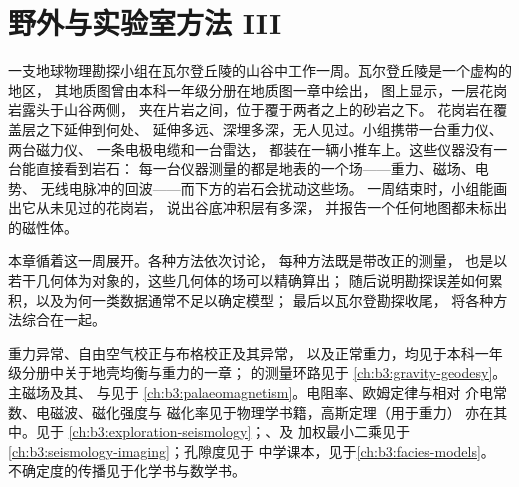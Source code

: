 \chapter{野外与实验室方法 III}\label{ch:b3:field-lab-methods-3}

一支地球物理勘探小组在瓦尔登丘陵的山谷中工作一周。瓦尔登丘陵是一个虚构的地区，
其地质图曾由本科一年级分册在地质图一章中绘出，
图上显示，一层花岗岩露头于山谷两侧，
夹在片岩之间，位于覆于两者之上的砂岩之下。
花岗岩在覆盖层之下延伸到何处、
延伸多远、深埋多深，无人见过。小组携带一台重力仪、两台磁力仪、
一条电极电缆和一台雷达，
都装在一辆小推车上。这些仪器没有一台能直接看到岩石：
每一台仪器测量的都是地表的一个场——重力、磁场、电势、
无线电脉冲的回波——而下方的岩石会扰动这些场。
一周结束时，小组能画出它从未见过的花岗岩，
说出谷底冲积层有多深，
并报告一个任何地图都未标出的磁性体。

本章循着这一周展开。各种方法依次讨论，
每种方法既是带改正的测量，
也是以若干几何体为对象的，这些几何体的场可以精确算出；
随后说明勘探误差如何累积，以及为何一类数据通常不足以确定模型；
最后以瓦尔登勘探收尾，
将各种方法综合在一起。

\begin{recall}
重力异常、自由空气校正与布格校正及其异常，
以及正常重力，均见于本科一年级分册中关于地壳均衡与重力的一章；
的测量环路见于
\cref{ch:b3:gravity-geodesy}。主磁场及其、
与见于
\cref{ch:b3:palaeomagnetism}。电阻率、欧姆定律与相对
介电常数、电磁波、磁化强度与
磁化率见于物理学书籍，高斯定理（用于重力）
亦在其中。见于
\cref{ch:b3:exploration-seismology}；、及
加权最小二乘见于\cref{ch:b3:seismology-imaging}；孔隙度见于
中学课本，见于\cref{ch:b3:facies-models}。
不确定度的传播见于化学书与数学书。
\end{recall}

